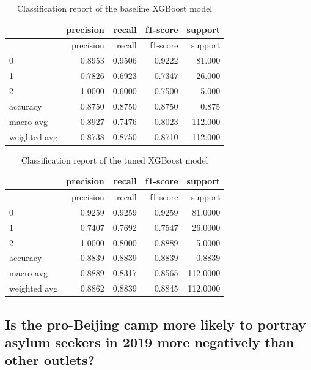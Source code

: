 \documentclass[a4paper, oneside]{report}
\newenvironment{Shaded}{\begin{snugshade}}{\end{snugshade}}
\newcommand{\AttributeTok}[1]{\textcolor[rgb]{0.77,0.63,0.00}{#1}}
\newcommand{\DecValTok}[1]{\textcolor[rgb]{0.00,0.00,0.81}{#1}}
\newcommand{\FunctionTok}[1]{\textcolor[rgb]{0.00,0.00,0.00}{#1}}
\newcommand{\NormalTok}[1]{#1}
\newcommand{\SpecialCharTok}[1]{\textcolor[rgb]{0.00,0.00,0.00}{#1}}
\newcommand{\StringTok}[1]{\textcolor[rgb]{0.31,0.60,0.02}{#1}}
\renewenvironment{Shaded}
{
  \vspace{4pt}%
  \begin{snugshade}%
}{%
  \end{snugshade}%
  \vspace{4pt}%
}
\begin{document}
\begin{longtable}[]{@{}lrrrr@{}}
\caption{Classification report of the baseline XGBoost
model}\tabularnewline
\toprule
& precision & recall & f1-score & support \\
\midrule
\endfirsthead
\toprule
& precision & recall & f1-score & support \\
\midrule
\endhead
0 & 0.8953 & 0.9506 & 0.9222 & 81.000 \\
1 & 0.7826 & 0.6923 & 0.7347 & 26.000 \\
2 & 1.0000 & 0.6000 & 0.7500 & 5.000 \\
accuracy & 0.8750 & 0.8750 & 0.8750 & 0.875 \\
macro avg & 0.8927 & 0.7476 & 0.8023 & 112.000 \\
weighted avg & 0.8738 & 0.8750 & 0.8710 & 112.000 \\
\bottomrule
\end{longtable}

\begin{Shaded}
\end{Shaded}

\begin{longtable}[]{@{}lrrrr@{}}
\caption{Classification report of the tuned XGBoost
model}\tabularnewline
\toprule
& precision & recall & f1-score & support \\
\midrule
\endfirsthead
\toprule
& precision & recall & f1-score & support \\
\midrule
\endhead
0 & 0.9259 & 0.9259 & 0.9259 & 81.0000 \\
1 & 0.7407 & 0.7692 & 0.7547 & 26.0000 \\
2 & 1.0000 & 0.8000 & 0.8889 & 5.0000 \\
accuracy & 0.8839 & 0.8839 & 0.8839 & 0.8839 \\
macro avg & 0.8889 & 0.8317 & 0.8565 & 112.0000 \\
weighted avg & 0.8862 & 0.8839 & 0.8845 & 112.0000 \\
\bottomrule
\end{longtable}

\hypertarget{is-the-pro-beijing-camp-more-likely-to-portray-asylum-seekers-in-2019-more-negatively-than-other-outlets}{%
\subsection{Is the pro-Beijing camp more likely to portray asylum
seekers in 2019 more negatively than other
outlets?}\label{is-the-pro-beijing-camp-more-likely-to-portray-asylum-seekers-in-2019-more-negatively-than-other-outlets}}
\end{document}
